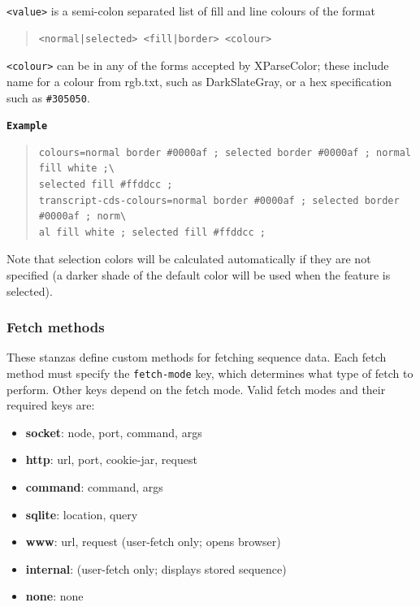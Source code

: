 \documentclass[letterpaper]{article}
\newcommand\textstyleSourceText[1]{\texttt{#1}}
\newcommand\liststyleLii{%
\renewcommand\labelitemi{{\textbullet}}
\renewcommand\labelitemii{{\textbullet}}
\renewcommand\labelitemiii{{\textbullet}}
\renewcommand\labelitemiv{{\textbullet}}
}
\begin{document}
\bigskip

\texttt{{\textless}value{\textgreater}} is a semi-colon separated list of fill and line colours of the format

\begin{quote}
\begin{verbatim}
<normal|selected> <fill|border> <colour>
\end{verbatim}
\end{quote}

\texttt{{\textless}colour{\textgreater}} can be in any of the forms accepted by XParseColor; these include name for a colour from rgb.txt, such as DarkSlateGray, or a hex specification such as \texttt{\#305050}.

\bigskip

{\textstyleSourceText{\textrm{\textbf{Example}}}\textbf{}}
\begin{quote}
\begin{verbatim}
colours=normal border #0000af ; selected border #0000af ; normal fill white ;\
selected fill #ffddcc ; 
transcript-cds-colours=normal border #0000af ; selected border #0000af ; norm\
al fill white ; selected fill #ffddcc ;
\end{verbatim}
\end{quote}

Note that selection colors will be calculated automatically if they are not specified (a darker shade of the default color will be used when the feature is selected).

{\color[rgb]{0.30980393,0.5058824,0.7411765}\subsubsection[Fetch methods ]{Fetch methods }}
{These stanzas define custom methods for fetching sequence data. Each
fetch method must specify the \textstyleSourceText{fetch-mode} key,
which determines what type of fetch to perform. Other keys depend on
the fetch mode. Valid fetch modes and their required keys are: }

\liststyleLii
\begin{itemize}
\item {\ttfamily\textbf{socket}: node, port, command, args }
\item {\ttfamily\textbf{http}: url, port, cookie-jar, request }
\item {\ttfamily\textbf{command}: command, args }
\item {\ttfamily\textbf{sqlite}: location, query }
\item {\ttfamily\textbf{www}: url, request (user-fetch only; opens browser) }
\item {\ttfamily\textbf{internal}: (user-fetch only; displays stored sequence) }
\item {\ttfamily\textbf{none}: none }
\end{itemize}
\end{document}
